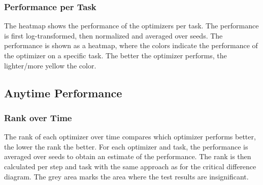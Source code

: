 \subsubsection{Performance per Task}
The heatmap shows the performance of the optimizers per task. The performance is first log-transformed, then normalized and averaged over seeds. The performance is shown as a heatmap, where the colors indicate the performance of the optimizer on a specific task. The better the optimizer performs, the lighter/more yellow the color.

\subsection{Anytime Performance}
\subsubsection{Rank over Time}
The rank of each optimizer over time compares which optimizer performs better, the lower the rank the better. For each optimizer and task, the performance is averaged over seeds to obtain an estimate of the performance. The rank is then calculated per step and task with the same approach as for the critical difference diagram. The grey area marks the area where the test results are insignificant.

